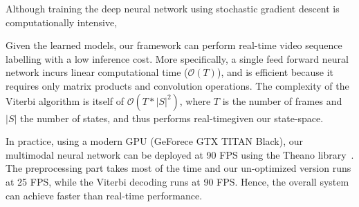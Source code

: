Although training the deep neural network using stochastic gradient descent is computationally intensive,

%
Given the learned models,  our framework can perform real-time video sequence labelling with a low inference cost.
%
More specifically, a single feed forward neural network incurs linear computational time ($\mathcal{O}(T)$),
and is efficient because it requires only matrix products and convolution operations.
The complexity of the Viterbi algorithm is itself of $\mathcal{O} (T* |S|^2)$, where
$T$ is the number of frames and $|S|$ the number of states, and thus performs real-timegiven our state-space.

In practice, using a modern GPU (GeForece GTX TITAN Black), our multimodal neural network can be deployed at 90 FPS using the
Theano library~\cite{Bastien-Theano-2012}.
The preprocessing part takes most of the time and our un-optimized version runs at 25 FPS, while the
 Viterbi decoding  runs at 90 FPS. Hence, the overall system can achieve faster than real-time performance.





\endinput
